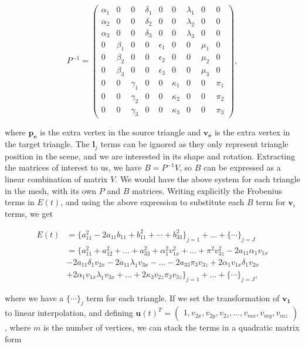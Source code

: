 \documentclass[12pt]{article}
\begin{document}
\begin{equation*}
P^{-1} = 
\begin{pmatrix}
\alpha_1 & 0 & 0 & \delta_1 & 0 & 0 & \lambda_1 & 0 & 0 \\
\alpha_2 & 0 & 0 & \delta_2 & 0 & 0 & \lambda_2 & 0 & 0 \\
\alpha_3 & 0 & 0 & \delta_3 & 0 & 0 & \lambda_3 & 0 & 0 \\
0 & \beta_1 & 0 & 0 & \epsilon_1 & 0 & 0 & \mu_1 & 0 \\
0 & \beta_2 & 0 & 0 & \epsilon_2 & 0 & 0 & \mu_2 & 0 \\
0 & \beta_3 & 0 & 0 & \epsilon_3 & 0 & 0 & \mu_3 & 0 \\
0 & 0 & \gamma_1 & 0 & 0 & \kappa_1 & 0 & 0 & \pi_1 \\
0 & 0 & \gamma_2 & 0 & 0 & \kappa_2 & 0 & 0 & \pi_2  \\
0 & 0 & \gamma_3 & 0 & 0 & \kappa_3 & 0 & 0 & \pi_3
\end{pmatrix},
\end{equation*}

where $\mathbf{p_e}$ is the extra vertex in the source triangle and $\mathbf{v_e}$ is the extra vertex in the target triangle.
The $\mathbf{l}_j$ terms can be ignored as they only represent triangle position in the scene, and we are interested in its shape and rotation.
Extracting the matrices of interest to us, we have $B = P^{-1}V$, so $B$ can be expressed as a linear combination of matrix $V$.
We would have the above system for each triangle in the mesh, with its own $P$ and $B$ matrices.  
Writing explicitly the Frobenius terms in $E(t)$, and using the above expression to substitute each $B$ term for $\mathbf{v}_i$ terms, we get

\begin{align*}
E(t) &= \lbrace a_{11}^2 - 2 a_{11} b_{11} + b_{11}^2 + \cdots +  b_{33}^2 \rbrace_{j = 1} + \ldots + \lbrace \cdots \rbrace_{j = J} \\ 
& = \lbrace a_{11}^2 + a_{12}^2 + \ldots + a_{33}^2 + \alpha_1^2 v_{1x}^2 + \ldots + \pi^2 v_{3z}^2 - 2 a_{11} \alpha_1 v_{1x} \\
& - 2 a_{11} \delta_1 v_{2x} - 2 a_{11} \lambda_1 v_{3x} - \ldots - 2 a_{33} \pi_3 v_{3z} + 2 \alpha_1 v_{1x} \delta_1 v_{2x} \\ 
& + 2 \alpha_1 v_{1x} \lambda_1 v_{3x} + \ldots + 2 \kappa_3 v_{2z} \pi_3 v_{3z} \rbrace_{j = 1} + \ldots + \lbrace \cdots \rbrace_{j = J},
\end{align*}

where we have a $\lbrace \cdots \rbrace_j$ term for each triangle.
If we set the transformation of $\mathbf{v_1}$ to linear interpolation, and defining 
$\mathbf{u}(t)^T = \begin{pmatrix} 1, v_{2x}, v_{2y}, v_{2z}, \ldots, v_{mx}, v_{my}, v_{mz} \end{pmatrix}$, where $m$ is the number of vertices, we can stack the terms in a quadratic matrix form 
\end{document}

